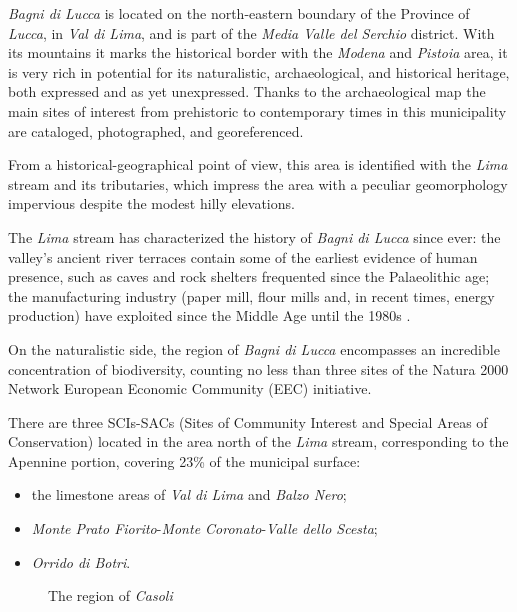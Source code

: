 \documentclass[sustainability,article,submit,pdftex,moreauthors]{Definitions/mdpi}
\begin{document}
\emph{Bagni di Lucca} is located on the north-eastern boundary of the Province of \emph{Lucca}, in \emph{Val di Lima}, and is part of the \textit{Media Valle del Serchio} district. With its mountains it marks the historical border with the \textit{Modena} and \textit{Pistoia} area, it is very rich in potential for its naturalistic, archaeological, and historical heritage, both expressed and as yet unexpressed. Thanks to the archaeological map the main sites of interest from prehistoric to contemporary times in this municipality are cataloged, photographed, and georeferenced.

From a historical-geographical point of view, this area is identified with the \emph{Lima} stream and its tributaries, which impress the area with a peculiar geomorphology impervious despite the modest hilly elevations.

The \emph{Lima} stream has characterized the history of \emph{Bagni di Lucca} since ever: the valley's ancient river terraces contain some of the earliest evidence of human presence, such as caves and rock shelters frequented since the Palaeolithic age; the manufacturing industry (paper mill, flour mills and, in recent times, energy production) have exploited since the Middle Age until the 1980s \cite{men76, bed05, ser21}.
 
On the naturalistic side, the region of \emph{Bagni di Lucca} encompasses an incredible concentration of biodiversity, counting no less than three sites of the Natura 2000 Network  European Economic Community (EEC) initiative.

There are three SCIs-SACs (Sites of Community Interest and Special Areas of Conservation) located in the area north of the \emph{Lima} stream, corresponding to the Apennine portion, covering 23\% of the municipal surface:
\begin {itemize}
\item the limestone areas of \emph{Val di Lima} and \emph{Balzo Nero}; 
\item \emph{Monte Prato Fiorito}-\emph{Monte Coronato}-\emph{Valle dello
Scesta}; 
\item \emph{Orrido di Botri}.
\end{itemize}


\begin{figure}
\hfill
{}
\hfill
{}
\caption[The region of \emph{Casoli}]{The region of \emph{Casoli}}
\label{fig:toscana-casoli}
\end{figure}
\end{document}
